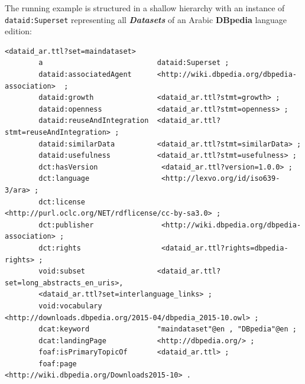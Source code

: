 \documentclass[a4paper,english,twoside,BCOR1.5cm,headsepline,DIV12,appendixprefix,final,12pt]{scrbook}
\newcommand{\dbpedia}{{\ttfamily\bfseries DBpedia}\xspace}
\newcommand{\prop}[1]{{{\texttt{#1}}}}
\newcommand{\important}[1]{\textbf{\textit{#1}}}
\begin{document}
The running example is structured in a shallow hierarchy with an instance of \prop{dataid:Superset} representing all \important{Datasets} of an Arabic \dbpedia language edition:
\\
\begin{lstlisting}[language=ttl, captionpos=b,caption=Instance of a Superset,label=lst:coresuperset,linewidth=\columnwidth,breaklines=true]
<dataid_ar.ttl?set=maindataset>
        a                           dataid:Superset ;
        dataid:associatedAgent      <http://wiki.dbpedia.org/dbpedia-association>  ;
        dataid:growth               <dataid_ar.ttl?stmt=growth> ;                                                 
        dataid:openness             <dataid_ar.ttl?stmt=openness> ;
        dataid:reuseAndIntegration  <dataid_ar.ttl?stmt=reuseAndIntegration> ;
        dataid:similarData          <dataid_ar.ttl?stmt=similarData> ;
        dataid:usefulness           <dataid_ar.ttl?stmt=usefulness> ;
        dct:hasVersion               <dataid_ar.ttl?version=1.0.0> ;
        dct:language                 <http://lexvo.org/id/iso639-3/ara> ;                                          
        dct:license                  <http://purl.oclc.org/NET/rdflicense/cc-by-sa3.0> ;  
        dct:publisher                <http://wiki.dbpedia.org/dbpedia-association> ;
        dct:rights                   <dataid_ar.ttl?rights=dbpedia-rights> ;
        void:subset                 <dataid_ar.ttl?set=long_abstracts_en_uris>, 
        <dataid_ar.ttl?set=interlanguage_links> ;
        void:vocabulary             <http://downloads.dbpedia.org/2015-04/dbpedia_2015-10.owl> ;                  
        dcat:keyword                "maindataset"@en , "DBpedia"@en ;
        dcat:landingPage            <http://dbpedia.org/> ;                                                       
        foaf:isPrimaryTopicOf       <dataid_ar.ttl> ;                                                             
        foaf:page                   <http://wiki.dbpedia.org/Downloads2015-10> .  
\end{lstlisting}
\end{document}
